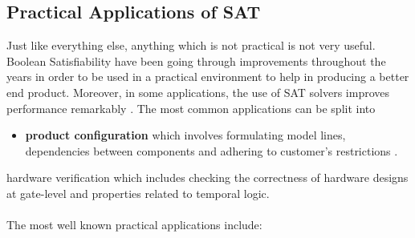 \documentclass{article}
\begin{document}
\begin{enumerate}
		
		
	\end{enumerate}
	

				
	



										

					
				
		
								
					
			\subsection{Practical Applications of SAT}
			
			Just like everything else, anything which is not practical is not very useful. Boolean Satisfiability have been going through improvements throughout the years in order to be used in a practical environment to help in producing a better end product. Moreover, in some
applications, the use of SAT solvers improves performance remarkably \cite{pa3}. The most common applications can be split into 
\begin{itemize}
\item\textbf{product configuration} which involves formulating model lines,  dependencies between components and adhering to customer's restrictions \cite{pa2}.
\end{itemize}
  hardware verification which includes checking the correctness of hardware designs at gate-level and properties related to temporal logic\cite{pa1}.	\\\\
The most well known practical applications include:
\end{document}
